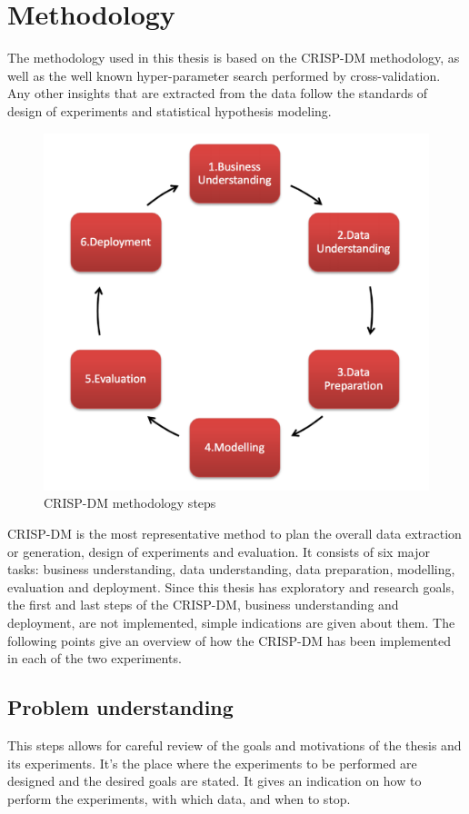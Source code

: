 \newpage
\section{Methodology}

The methodology used in this thesis is based on the CRISP-DM methodology, as well as the well known hyper-parameter search performed by cross-validation. Any other insights that are extracted from the data follow the standards of design of experiments and statistical hypothesis modeling.

\begin{figure}[H]
    \centering
        \includegraphics[width=0.6\linewidth]{img/crisp-dm.png}
    \caption{CRISP-DM methodology steps}\label{fig:crisp}
\end{figure}


CRISP-DM is the most representative method to plan the overall data extraction or generation, design of experiments and evaluation. It consists of six major tasks: business understanding, data understanding, data preparation, modelling, evaluation and deployment. Since this thesis has exploratory and research goals, the first and last steps of the CRISP-DM, business understanding and deployment, are not implemented, simple indications are given about them. The following points give an overview of how the CRISP-DM has been implemented in each of the two experiments.

\subsection{Problem understanding}

This steps allows for careful review of the goals and motivations of the thesis and its experiments. It's the place where the experiments to be performed are designed and the desired goals are stated. It gives an indication on how to perform the experiments, with which data, and when to stop.

